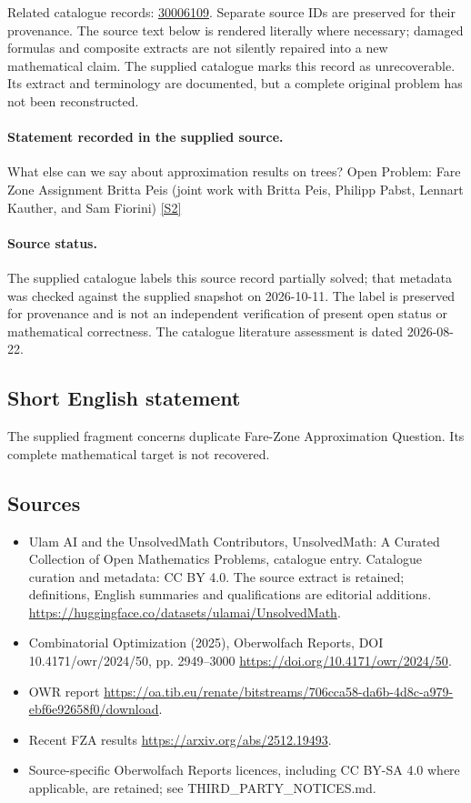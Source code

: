 \documentclass[11pt]{article}
\begin{document}
Related catalogue records: \href{https://mehmetmars7.github.io/Erdosproblems-llm-hunter/problem.html?type=open_problems&id=30006109}{30006109}. Separate source IDs are preserved for their provenance.
The source text below is rendered literally where necessary; damaged formulas and composite extracts are not silently repaired into a new mathematical claim.
The supplied catalogue marks this record as unrecoverable. Its extract and terminology are documented, but a complete original problem has not been reconstructed.
\paragraph{Statement recorded in the supplied source.}
What else can we say about approximation results on trees? Open Problem: Fare Zone Assignment Britta Peis (joint work with Britta Peis, Philipp Pabst, Lennart Kauther, and Sam Fiorini) \href{https://doi.org/10.4171/owr/2024/50}{[S2]}
\paragraph{Source status.}
The supplied catalogue labels this source record partially solved; that metadata was checked against the supplied snapshot on 2026-10-11. The label is preserved for provenance and is not an independent verification of present open status or mathematical correctness. The catalogue literature assessment is dated 2026-08-22.
\subsection{Short English statement}
The supplied fragment concerns duplicate Fare-Zone Approximation Question. Its complete mathematical target is not recovered.
\subsection{Sources}
\begin{itemize}
\item[S1] Ulam AI and the UnsolvedMath Contributors, UnsolvedMath: A Curated Collection of Open Mathematics Problems, catalogue entry. Catalogue curation and metadata: CC BY 4.0. The source extract is retained; definitions, English summaries and qualifications are editorial additions.
\url{https://huggingface.co/datasets/ulamai/UnsolvedMath}.
\item[S2] Combinatorial Optimization (2025), Oberwolfach Reports, DOI 10.4171/owr/2024/50, pp. 2949--3000
\url{https://doi.org/10.4171/owr/2024/50}.
\item[S3] OWR report
\url{https://oa.tib.eu/renate/bitstreams/706cca58-da6b-4d8c-a979-ebf6e92658f0/download}.
\item[S4] Recent FZA results
\url{https://arxiv.org/abs/2512.19493}.
\item Source-specific Oberwolfach Reports licences, including CC BY-SA 4.0 where applicable, are retained; see THIRD\_PARTY\_NOTICES.md.
\end{itemize}
\end{document}

